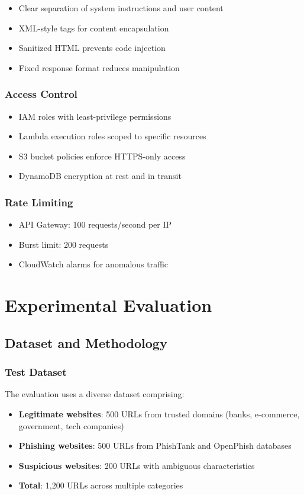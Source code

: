 \documentclass[conference]{IEEEtran}
\begin{document}
\begin{itemize}
\item Clear separation of system instructions and user content
\item XML-style tags for content encapsulation
\item Sanitized HTML prevents code injection
\item Fixed response format reduces manipulation
\end{itemize}

\subsubsection{Access Control}

\begin{itemize}
\item IAM roles with least-privilege permissions
\item Lambda execution roles scoped to specific resources
\item S3 bucket policies enforce HTTPS-only access
\item DynamoDB encryption at rest and in transit
\end{itemize}

\subsubsection{Rate Limiting}

\begin{itemize}
\item API Gateway: 100 requests/second per IP
\item Burst limit: 200 requests
\item CloudWatch alarms for anomalous traffic
\end{itemize}


\section{Experimental Evaluation}

\subsection{Dataset and Methodology}

\subsubsection{Test Dataset}

The evaluation uses a diverse dataset comprising:
\begin{itemize}
\item \textbf{Legitimate websites}: 500 URLs from trusted domains (banks, e-commerce, government, tech companies)
\item \textbf{Phishing websites}: 500 URLs from PhishTank and OpenPhish databases
\item \textbf{Suspicious websites}: 200 URLs with ambiguous characteristics
\item \textbf{Total}: 1,200 URLs across multiple categories
\end{itemize}
\end{document}
